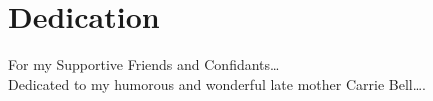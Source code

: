 \documentclass[
12pt, %
english, %
doublespacing, %
nolistspacing, %
liststotoc, %
headsepline, %
chapterinoneline, %
openany, %
]{DoctoralThesis} %
\newcounter{row}
\newenvironment{dedication}
  {\clearpage           %
   \thispagestyle{empty}%
   \vspace*{\stretch{1}}%
   \section*{Dedication}%
   \itshape             %
   \justifying          %

  }
  {\par                 %
   \vspace{\stretch{3}} %
   \clearpage           %
  }
\begin{document}





%


%

\begin{dedication}
    For my Supportive Friends and Confidants\ldots \\\bigskip
    Dedicated to my humorous and
    wonderful late mother Carrie Bell\ldots.
    \end{dedication}
\end{document}
